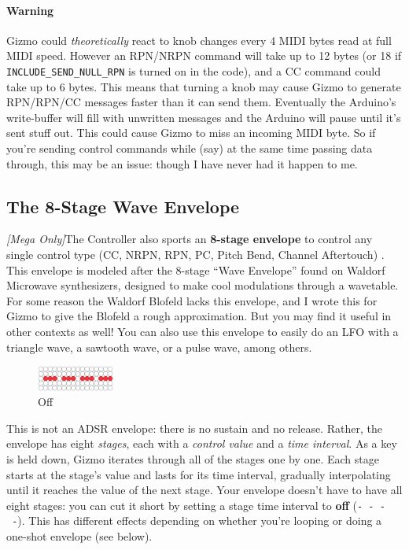 \documentclass{article}
\begin{document}
\paragraph{Warning} Gizmo could {\it theoretically} react to knob changes every 4 MIDI bytes read at full MIDI speed.  However an RPN/NRPN command will take up to 12 bytes (or 18 if \texttt{INCLUDE\_SEND\_NULL\_RPN} is turned on in the code), and a CC command could take up to 6 bytes.  This means that turning a knob may cause Gizmo to generate RPN/RPN/CC messages faster than it can send them.  Eventually the Arduino's write-buffer will fill with unwritten messages and the Arduino will pause until it's sent stuff out.  This could cause Gizmo to miss an incoming MIDI byte.  So if you're sending control commands while (say) at the same time passing data through, this may be an issue: though I have never had it happen to me.

\subsection{The 8-Stage Wave Envelope}
\label{waveenvelope}

\textit{[Mega Only]}\qquad The Controller also sports an {\bf 8-stage envelope} to control any single control type (CC, NRPN, RPN, PC, Pitch Bend, Channel Aftertouch)%
.  This envelope is modeled after the 8-stage ``Wave Envelope'' found on Waldorf Microwave synthesizers, designed to make cool modulations through a wavetable.  For some reason the Waldorf Blofeld lacks this envelope, and I wrote this for Gizmo to give the Blofeld a rough approximation.  But you may find it useful in other contexts as well!  You can also use this envelope to easily do an LFO with a triangle wave, a sawtooth wave, or a pulse wave, among others.

\begin{figure}
\includegraphics[width=1in]{none.pdf}
\vspace{-2em}\caption{\small Off}\vspace{-1em}
\end{figure}

 This is not an ADSR envelope: there is no sustain and no release.  Rather, the envelope has eight {\it stages}, each with a {\it control value} and a {\it time interval}.  As a key is held down, Gizmo iterates through all of the stages one by one.  Each stage starts at the stage's value and lasts for its time interval, gradually interpolating until it reaches the value of the next stage.  Your envelope doesn't have to have all eight stages: you can cut it short by setting a stage time interval to {\bf off} (\texttt{-~-~-~-}).  This has different effects depending on whether you're looping or doing a one-shot envelope (see below).
\end{document}
